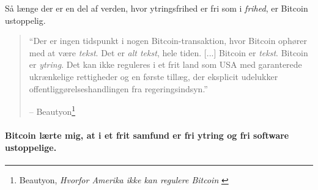 Så længe der er en del af verden, hvor ytringsfrihed er fri som i 
\textit{frihed}, er Bitcoin ustoppelig.

\begin{quotation}\begin{samepage}
\enquote{Der er ingen tidspunkt i nogen Bitcoin-transaktion, hvor Bitcoin
ophører med at være \textit{tekst}. Det er \textit{alt tekst}, hele tiden.
[...] Bitcoin er \textit{tekst}. Bitcoin er \textit{ytring}. Det kan ikke 
reguleres i et frit land som USA med garanterede ukrænkelige rettigheder og en 
første tillæg, der eksplicit udelukker offentliggørelseshandlingen fra 
regeringsindsyn.}
\begin{flushright} -- Beautyon\footnote{Beautyon, \textit{Hvorfor Amerika ikke 
    kan regulere
Bitcoin} \cite{america-regulate-bitcoin}}
\end{flushright}\end{samepage}\end{quotation}

\paragraph{Bitcoin lærte mig, at i et frit samfund er fri ytring og fri 
software ustoppelige.}

%
%
%
%
%
%
%
